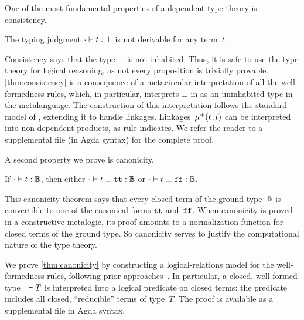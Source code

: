 One of the most fundamental properties of a dependent type theory is consistency.
\begin{theorem}[Consistency]
\label{thm:consistency}
  The typing judgment $ {\cdot} \vdash {t} : {\bot} $ is not derivable for any term~$t$.
\end{theorem}

\noindent
Consistency says that the type $\bot$ is not inhabited.
Thus, it is safe to use the type theory for logical reasoning, as not
every proposition is trivially provable.
\cref{thm:consistency} is a consequence of a meta\-circular interpretation of all
the well-formedness rules, which, in particular, interprets $\bot$ in
\TT as an uninhabited type in the meta\-language.
The construction of this interpretation follows the standard model of
\citet{altkap2016}, extending it to handle linkages.
Linkages~$\mu^+({\ell},{t})$ can be interpreted into non-dependent products,
as rule  indicates.
%
We refer the reader to a supplemental file (in Agda syntax) for the complete proof.


A second property we prove is canonicity.

\begin{theorem}[Canonicity]
\label{thm:canonicity}
  If $ {\cdot} \vdash {t} : {\mathbb{B}} $, then either $ {\cdot} \vdash {t \equiv \ensuremath{\texttt{tt}}} : {\mathbb{B}} $ or $ {\cdot} \vdash {t \equiv \ensuremath{\texttt{ff}}} : {\mathbb{B}} $.
\end{theorem}

\noindent
This canonicity theorem says that every closed term of the ground
type~$\mathbb{B}$ is convertible to one of the canonical forms $\texttt{tt}$ and~$\texttt{ff}$.
When canonicity is proved in a constructive meta\-logic, its proof
amounts to a normalization function for closed terms of the ground type.
So canonicity serves to justify the computational nature of the type theory.

We prove \cref{thm:canonicity} by constructing a logical-relations model
for the well-formedness rules, following prior approaches~\cite{coquand2018canonicity,sterling2019algebraic,kaposi2019gluing}.
In particular, a closed, well formed type $ {\cdot} \vdash {T} $ is interpreted
into a logical predicate on closed terms: the predicate includes all
closed, ``reducible'' terms of type~$T$.
The proof is available as a supplemental file in Agda syntax.